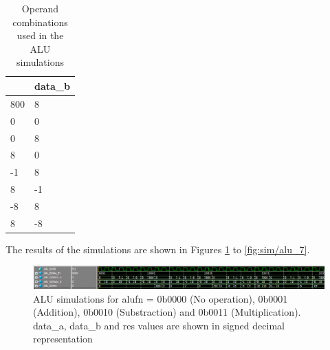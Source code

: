 \begin{table}[H]
    \centering
    \begin{tabular}{|l|l|}
    \hline
    \rowcolor[HTML]{DAE8FC} 
    \multicolumn{1}{|c|}{\cellcolor[HTML]{DAE8FC}\textbf{data\_a}} & \multicolumn{1}{c|}{\cellcolor[HTML]{DAE8FC}\textbf{data\_b}} \\ \hline
    800                                                            & 8                                                             \\ \hline
    0                                                              & 0                                                             \\ \hline
    0                                                              & 8                                                             \\ \hline
    8                                                              & 0                                                             \\ \hline
    -1                                                             & 8                                                             \\ \hline
    8                                                              & -1                                                            \\ \hline
    -8                                                             & 8                                                             \\ \hline
    8                                                              & -8                                                            \\ \hline
    \end{tabular}
    \caption{Operand combinations used in the ALU simulations}
    \label{tab:alu/sim}
\end{table}

The results of the simulations are shown in Figures \ref{fig:sim/alu_0} to \ref{fig:sim/alu_7}.

\begin{figure}[H]
    \centering
    \includegraphics[width=\linewidth]{Chapter3-CPU/res/alu_simu_0.PNG}
    \caption{ALU simulations for alufn = 0b0000 (No operation), 0b0001 (Addition), 0b0010 (Substraction) 
    and 0b0011 (Multiplication). data\_a, data\_b and res values are shown in signed decimal 
    representation}
    \label{fig:sim/alu_0}
\end{figure}

